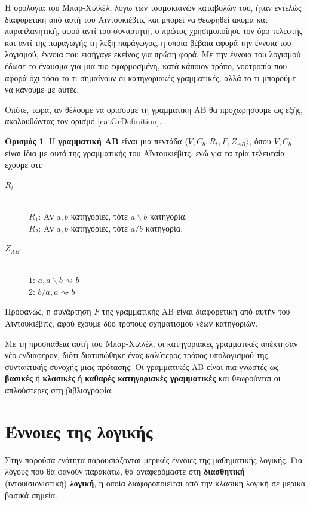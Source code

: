 \documentclass [a4paper,11pt] {book}
\theoremstyle{definition}
\theoremstyle{definition}
\newtheorem{definition}[theorem]{Ορισμός}
\begin{document}
Η ορολογία του Μπαρ-Χιλλέλ, λόγω των τσομσκιανών καταβολών του, ήταν εντελώς διαφορετική από αυτή του Αϊντουκιέβιτς και μπορεί να θεωρηθεί ακόμα και παραπλανητική, αφού αντί του συναρτητή, ο πρώτος χρησιμοποίησε τον όρο τελεστής και αντί της παραγωγής τη λέξη παράγωγος, η οποία βέβαια αφορά την έννοια του λογισμού, έννοια που εισήγαγε εκείνος για πρώτη φορά. Με την έννοια του λογισμού έδωσε το έναυσμα για μια πιο εφαρμοσμένη, κατά κάποιον τρόπο, νοοτροπία που αφορά όχι τόσο το τι σημαίνουν οι κατηγοριακές γραμματικές, αλλά το τι μπορούμε να κάνουμε με αυτές.

Οπότε, τώρα, αν θέλουμε να ορίσουμε τη γραμματική ΑΒ θα προχωρήσουμε ως εξής, ακολουθώντας τον ορισμό \ref{catGrDefinition}.
\begin{definition}
\label{AB-grammar}
Η \textbf{γραμματική ΑΒ} είναι μια πεντάδα $\langle V,C_{b},R_{t},F,Z_{AB}\rangle$, όπου $V,C_{b}$ είναι ίδια με αυτά της γραμματικής του Αϊντουκιέβιτς, ενώ για τα τρία τελευταία έχουμε ότι:
\begin{description}
\item[$R_{t}$] \hfill \\
$R_{1}$: Αν $a,b$ κατηγορίες, τότε $a\backslash b$ κατηγορία. \\
$R_{2}$: Αν $a,b$ κατηγορίες, τότε $a/b$ κατηγορία.
\item[$Z_{AB}$] \hfill \\
$1$: $a, a\backslash b \rightsquigarrow b$ \\
$2$: $b/a, a \rightsquigarrow b$
\end{description}
Προφανώς, η συνάρτηση $F$ της γραμματικής ΑΒ είναι διαφορετική από αυτήν του Αϊντουκιέβιτς, αφού έχουμε δύο τρόπους σχηματισμού νέων κατηγοριών.
\end{definition}
Με τη προσπάθεια αυτή του Μπαρ-Χιλλέλ, οι κατηγοριακές γραμματικές απέκτησαν νέο ενδιαφέρον, διότι διατυπώθηκε ένας καλύτερος τρόπος υπολογισμού της συντακτικής συνοχής μιας πρότασης. Οι γραμματικές ΑΒ είναι πια γνωστές ως \textbf{βασικές} ή \textbf{κλασικές} ή \textbf{καθαρές κατηγοριακές γραμματικές} και θεωρούνται οι απλούστερες στη βιβλιογραφία.



\section{Έννοιες της λογικής}
\label{sec:LogicIntro}
Στην παρούσα ενότητα παρουσιάζονται μερικές έννοιες της μαθηματικής λογικής. Για λόγους που θα φανούν παρακάτω, θα αναφερόμαστε στη \textbf{διασθητική} (ιντουϊσιονιστική) \textbf{λογική}, η οποία διαφοροποιείται από την κλασική λογική σε μερικά βασικά σημεία.
\end{document}

